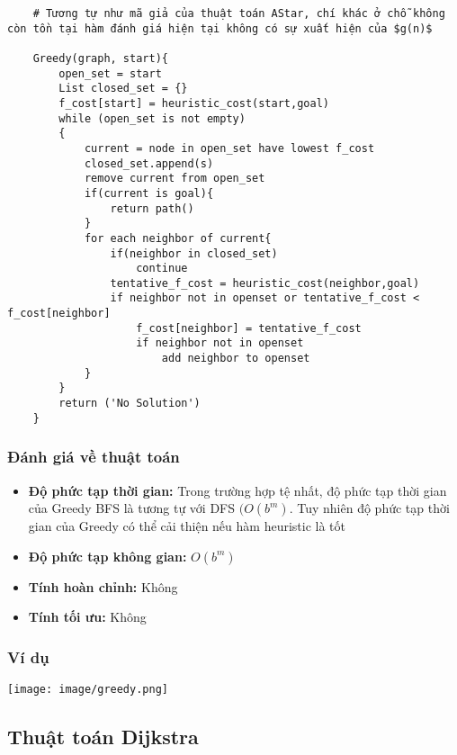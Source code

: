 \documentclass{article}
\begin{document}
\begin{verbatim}
    # Tương tự như mã giả của thuật toán AStar, chí khác ở chỗ không còn tồn tại hàm đánh giá hiện tại không có sự xuất hiện của $g(n)$
    
    Greedy(graph, start){
        open_set = start 
        List closed_set = {}
        f_cost[start] = heuristic_cost(start,goal)
        while (open_set is not empty)
        {
            current = node in open_set have lowest f_cost
            closed_set.append(s)  
            remove current from open_set
            if(current is goal){
                return path()
            }
            for each neighbor of current{
                if(neighbor in closed_set)
                    continue
                tentative_f_cost = heuristic_cost(neighbor,goal)
                if neighbor not in openset or tentative_f_cost < f_cost[neighbor]
                    f_cost[neighbor] = tentative_f_cost
                    if neighbor not in openset
                        add neighbor to openset 
            }
        } 
        return ('No Solution')
    }
\end{verbatim}

\subsubsection{Đánh giá về thuật toán}
\begin{itemize}
    \item \textbf{Độ phức tạp thời gian:} Trong trường hợp tệ nhất, độ phức tạp thời gian của Greedy BFS là tương tự với DFS $(O(b^m)$. Tuy nhiên độ phức tạp thời gian của Greedy có thể cải thiện nếu hàm heuristic là tốt
    \item \textbf{Độ phức tạp không gian:} $O(b^m)$ 
    \item \textbf{Tính hoàn chỉnh:} Không
    \item \textbf{Tính tối ưu:} Không
\end{itemize}

\subsubsection{Ví dụ}
    \centerline{\texttt{[image: image/greedy.png]}}
    \vspace{2\baselineskip}
\subsection{Thuật toán Dijkstra}
\end{document}
